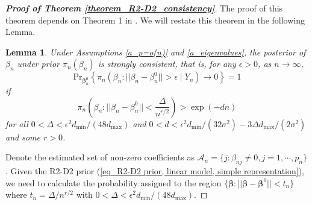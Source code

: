 \documentclass[12pt]{article}
\newtheorem{lemma}{Lemma}
\begin{document}
\begin{proof} [\textbf{Proof of Theorem \ref{theorem_R2-D2_consistency}}]
	The proof of this theorem depends on Theorem 1 in \cite{armagan2013posterior}.   We will restate this theorem in the following Lemma.

%
%

\begin{lemma}\label{lemma_theorem 1 in armagan}
Under Assumptions \ref{a_p=o(n)} and \ref{a_eigenvalues}, the posterior of $\beta_n$ under prior $\pi_n(\beta_n)$ is strongly consistent, that is, for any $\epsilon>0$,  as $n\rightarrow\infty$,
\[
\text{Pr}_{\bm\beta^0_n}  \left\{ \pi_n ( \beta_n: ||\beta_n - \beta_n^0|| >\epsilon \mid Y_n  )\rightarrow 0 \right\}  =1
\]
if
\[
\pi_n ( \beta_n: ||\beta_n - \beta_n^0||  < \frac{\Delta}{n^{r/2}}) >\exp(-dn)
\]
for all $0<\Delta<\epsilon^2 d_\text{min} /(48d_\text{max})$ and $0<d<\epsilon^2 d_\text{min}/(32\sigma^2) -3\Delta d_\text{max} /(2\sigma^2)$ and some $r>0$.
\end{lemma}

	Denote  the
	estimated set of non-zero coefficients as $\mathcal{A}_n=\{j:\beta_{nj}\neq0, j=1,\cdots, p_n\}$.
	Given the  R2-D2  prior (\ref{eq_R2-D2 prior, linear model, simple representation}),  we need to calculate the probability assigned to the region  $\{ \bm\beta:|| \bm\beta- \bm\beta^0|| < t_n\}$  where   $t_n =  {\Delta} / {n^{r/2}}$  with $0<\Delta < \epsilon^2 d_\text{min}/ (48 d_\text{max})$.


\end{proof}
\end{document}
